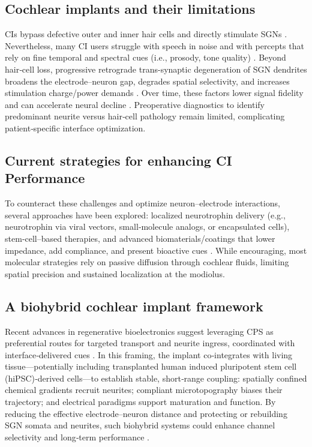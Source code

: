 \documentclass[referee,pdflatex, sn-vancouver-num]{sn-jnl}%
\theoremstyle{thmstyleone}%
\theoremstyle{thmstyletwo}%
\theoremstyle{thmstylethree}%
\DeclareRobustCommand{\textendash}{\ifmmode\text{-}\else\leavevmode\hbox{--}\fi}
\begin{document}
\subsection{Cochlear implants and their limitations}
CIs bypass defective outer and inner hair cells and directly stimulate SGNs \cite{wilson2008, wilson2014}. Nevertheless, many CI users struggle with speech in noise and with percepts that rely on fine temporal and spectral cues (i.e., prosody, tone quality) \cite{Hwa2021,deQuillettes2024_EarHear_TargetFitting}. Beyond hair‑cell loss, progressive retrograde trans-synaptic degeneration of SGN dendrites broadens the electrode\textendash neuron gap, degrades spatial selectivity, and increases stimulation charge/power demands \cite{Nadol1989}. Over time, these factors lower signal fidelity and can accelerate neural decline \cite{glueckert2008,Micco2006,Vecchi2024}. Preoperative diagnostics to identify predominant neurite versus hair‑cell pathology remain limited, complicating patient‑specific interface optimization.

\subsection{Current strategies for enhancing CI Performance}
To counteract these challenges and optimize neuron–electrode interactions, several approaches have been explored: localized neurotrophin delivery (e.g., neurotrophin via viral vectors, small‑molecule analogs, or encapsulated cells), stem‑cell–based therapies, and advanced biomaterials/coatings that lower impedance, add compliance, and present bioactive cues \cite{Scheper2019,Chang2020,Kempfle2021,StPeter2022,Horne2023_ActaBiomater_ZwitterionCI, Vecchi2024}. While encouraging, most molecular strategies rely on passive diffusion through cochlear fluids, limiting spatial precision and sustained localization at the modiolus.

\subsection{A biohybrid cochlear implant framework}
Recent advances in regenerative bioelectronics suggest leveraging CPS as preferential routes for targeted transport and neurite ingress, coordinated with interface‑delivered cues \cite{senn2017, CarnicerLombarte2024AdvMat, Starovoyt2023_SciRep_CochleaMicroCT, Sriperumbudur2024_SciRep_ModPorosity}. In this framing, the implant co‑integrates with living tissue—potentially including transplanted human induced pluripotent stem cell (hiPSC)‑derived cells—to establish stable, short‑range coupling: spatially confined chemical gradients recruit neurites; compliant microtopography biases their trajectory; and electrical paradigms support maturation and function. By reducing the effective electrode–neuron distance and protecting or rebuilding SGN somata and neurites, such biohybrid systems could enhance channel selectivity and long‑term performance \cite{Nella2022NeurotrophinGradients, Fenov2024}.
\end{document}
